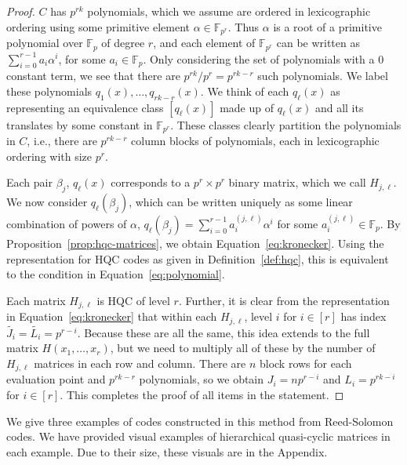 \documentclass[11pt]{amsart}
\theoremstyle{definition}
\newcommand{\0}{\mathbf{0}}
\newcommand{\F}{\mathbb{F}}
\begin{document}
\begin{proof}
    $C$ has $p^{rk}$ polynomials, which we assume are ordered in lexicographic ordering using some primitive element $\alpha \in \F_{p^r}$. Thus $\alpha$ is a root of a primitive polynomial over $\mathbb{F}_p$ of degree $r$, and each element of $\mathbb{F}_{p^r}$ can be written as $\sum_{i=0}^{r-1} a_i\alpha^i$, for some $a_i\in \mathbb{F}_p$. Only considering the set of polynomials with a $0$ constant term, we see that there are $p^{rk}/p^r = p^{rk-r}$ such polynomials. We label these polynomials $q_1(x), \dotsc, q_{rk-r}(x)$. We think of each $q_\ell(x)$ as representing an equivalence class $[q_\ell(x)]$ made up of $q_\ell(x)$ and all its translates by some constant in $\F_{p^r}$. These classes clearly partition the polynomials in $C$, i.e., there are $p^{rk-r}$ column blocks of polynomials, each in lexicographic ordering with size $p^r$. 

    Each pair $\beta_j$, $q_\ell(x)$ corresponds to a $p^r \times p^r$ binary matrix, which we call $H_{j,\ell}$. We now consider $q_\ell(\beta_j)$, which can be written uniquely as some linear combination of powers of $\alpha$, $q_\ell(\beta_j) = \sum_{i=0}^{r-1} a_i^{(j,\ell)}\alpha^i$ for some $a_i^{(j,\ell)} \in \F_p$. By Proposition~\ref{prop:hqc-matrices}, we obtain Equation~\ref{eq:kronecker}. Using the representation for HQC codes as given in Definition~\ref{def:hqc}, this is equivalent to the condition in Equation~\ref{eq:polynomial}.

    Each matrix $H_{j,\ell}$ is HQC of level $r$. Further, it is clear from the representation in Equation~\ref{eq:kronecker} that within each $H_{j,\ell}$, level $i$ for $i \in [r]$ has index $\tilde{J_i} = \tilde{L_i} = p^{r-i}$. Because these are all the same, this idea extends to the full matrix $H(x_1, \dotsc, x_r)$, but we need to multiply all of these by the number of $H_{j,\ell}$ matrices in each row and column. There are $n$ block rows for each evaluation point and $p^{rk-r}$ polynomials, so we obtain $J_i = n p^{r-i}$ and $L_i = p^{rk-i}$ for $i \in [r]$. 
    This completes the proof of all items in the statement.
\end{proof}

We give three examples of codes constructed in this method from Reed-Solomon codes. We have provided visual examples of hierarchical quasi-cyclic matrices in each example. Due to their size, these visuals are in the Appendix.
\end{document}
